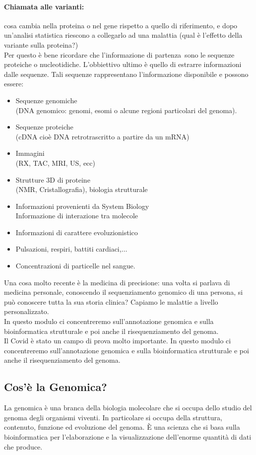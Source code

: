 \documentclass{article}
\begin{document}
\paragraph{Chiamata alle varianti:} cosa cambia nella proteina o nel gene rispetto a quello di riferimento, e dopo un'analisi statistica riescono a collegarlo ad una malattia (qual è l'effetto della variante sulla proteina?)\\
Per questo è bene ricordare che l'informazione di partenza sono le sequenze proteiche o nucleotidiche. L'obbiettivo ultimo è quello di estrarre informazioni dalle sequenze. Tali sequenze rappresentano l'informazione disponibile e possono essere:
\begin{itemize}
    \item Sequenze genomiche\\  (DNA genomico: genomi, esomi o alcune regioni particolari del genoma).
    \item Sequenze proteiche\\ (cDNA cioè DNA retrotrascritto a partire da un mRNA)
    \item Immagini\\ (RX, TAC, MRI, US, ecc)
    \item Strutture 3D di proteine\\ (NMR, Cristallografia), biologia strutturale
    \item Informazioni provenienti da System Biology \\ Informazione di interazione tra molecole
    \item Informazioni di carattere evoluzionistico
    \item Pulsazioni, respiri, battiti cardiaci,$ \dots $
    \item Concentrazioni di particelle nel sangue.
\end{itemize}
Una cosa molto recente è la medicina di precisione: una volta si parlava di medicina personale, conoscendo il sequenziamento genomico di una persona, si può conoscere tutta la sua storia clinica? Capiamo le malattie a livello personalizzato.\\
In questo modulo ci concentreremo sull'annotazione genomica e sulla bioinformatica strutturale e poi anche il risequenziamento del genoma.\\
Il Covid è stato un campo di prova molto importante. In questo modulo ci concentreremo sull’annotazione genomica e sulla bioinformatica strutturale e poi anche il risequenziamento del genoma.

\subsection{Cos'è la Genomica?}
La genomica è una branca della biologia molecolare che si occupa dello studio
del genoma degli organismi viventi. In particolare si occupa della struttura,
contenuto, funzione ed evoluzione del genoma. È una scienza che si basa
sulla bioinformatica per l'elaborazione e la visualizzazione dell'enorme quantità di
dati che produce.
\end{document}
